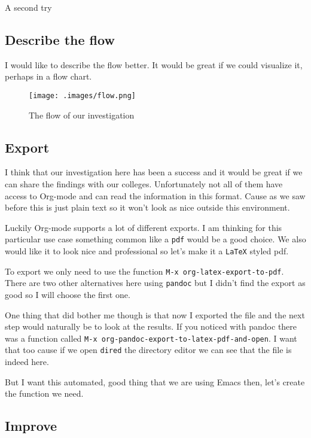 \documentclass[11pt]{article}
\begin{document}
A second try

\subsection*{Describe the flow}
\label{sec:org33dbfc2}

I would like to describe the flow better. It would be great if we could
visualize it, perhaps in a flow chart.

\begin{figure}[htbp]
\centering
\texttt{[image: .images/flow.png]}
\caption{The flow of our investigation}
\end{figure}

\subsection*{Export}
\label{sec:orga13187c}

I think that our investigation here has been a success and it would be great if
we can share the findings with our colleges. Unfortunately not all of them have
access to Org-mode and can read the information in this format. Cause as we saw
before this is just plain text so it won't look as nice outside this
environment.

Luckily Org-mode supports a lot of different exports. I am thinking for this
particular use case something common like a \texttt{pdf} would be a good choice. We
also would like it to look nice and professional so let's make it a \texttt{LaTeX}
styled pdf.

To export we only need to use the function \texttt{M-x org-latex-export-to-pdf}. There
are two other alternatives here using \texttt{pandoc} but I didn't find the export as
good so I will choose the first one.

One thing that did bother me though is that now I exported the file and the next
step would naturally be to look at the results. If you noticed with pandoc there
was a function called \texttt{M-x org-pandoc-export-to-latex-pdf-and-open}. I want that
too cause if we open \texttt{dired} the directory editor we can see that the file is
indeed here.

But I want this automated, good thing that we are using Emacs then, let's create
the function we need.

\subsection*{Improve}
\label{sec:org427612f}
\end{document}
